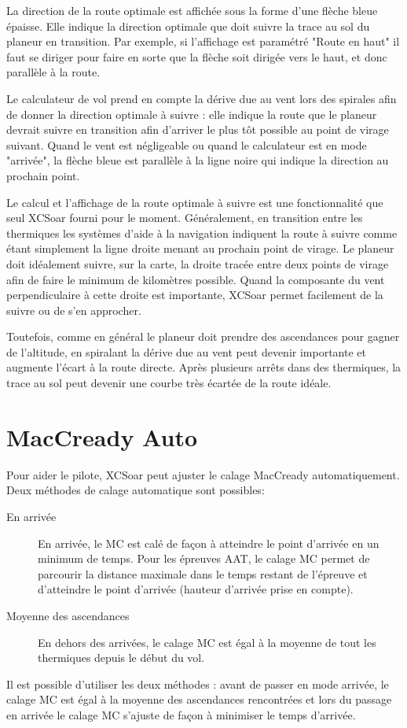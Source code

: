 La direction de la route optimale est affichée sous la forme d'une flèche bleue épaisse. Elle indique la direction optimale que doit suivre la trace au sol du planeur en transition. Par exemple, si l'affichage est paramétré "Route en haut" il faut se diriger pour faire en sorte que la flèche soit dirigée vers le haut, et donc parallèle à la route.

Le calculateur de vol prend en compte la dérive due au vent lors des spirales afin de donner la direction optimale à suivre : elle indique la route que le planeur devrait suivre en transition afin d'arriver le plus tôt possible au point de virage suivant. Quand le vent est négligeable ou quand le calculateur est en mode "arrivée", la flèche bleue est parallèle à la ligne noire qui indique la direction au prochain point.

Le calcul et l'affichage de la route optimale à suivre est une fonctionnalité que seul XCSoar fourni pour le moment. Généralement, en transition entre les thermiques les systèmes d'aide à la navigation indiquent la route à suivre comme étant simplement la ligne droite menant au prochain point de virage. Le planeur doit idéalement suivre, sur la carte, la droite tracée entre deux points de virage afin de faire le minimum de kilomètres possible. Quand la composante du vent perpendiculaire à cette droite est importante, XCSoar permet facilement de la suivre ou de s'en approcher.

Toutefois, comme en général le planeur doit prendre des ascendances pour gagner de l'altitude, en spiralant la dérive due au vent peut devenir importante et augmente l'écart à la route directe. Après plusieurs arrêts dans des thermiques, la trace au sol peut devenir une courbe très écartée de la route idéale.

\section{MacCready Auto}\label{sec:auto-maccready}

Pour aider le pilote, XCSoar peut ajuster le calage MacCready automatiquement. Deux méthodes de calage automatique sont possibles:
\begin{description}
\item[En arrivée]  En arrivée, le MC est calé de façon à atteindre le point d'arrivée en un minimum de temps. Pour les épreuves AAT, le calage MC permet de parcourir la distance maximale dans le temps restant de l'épreuve et d'atteindre le point d'arrivée (hauteur d'arrivée prise en compte).
\item[Moyenne des ascendances] En dehors des arrivées, le calage MC est égal à la moyenne de tout les thermiques depuis le début du vol.
\end{description}
Il est possible d'utiliser les deux méthodes : avant de passer en mode arrivée, le calage MC est égal à la moyenne des ascendances rencontrées et lors du passage en arrivée le calage MC s'ajuste de façon à minimiser le temps d'arrivée.

